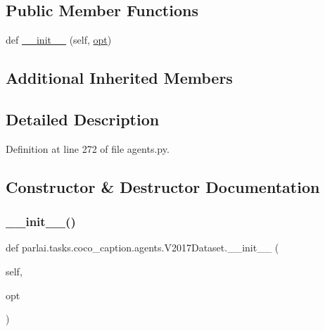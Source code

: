 \subsection*{Public Member Functions}
\begin{DoxyCompactItemize}
\item 
def \hyperlink{classparlai_1_1tasks_1_1coco__caption_1_1agents_1_1V2017Dataset_a7469de10b2d6e7c7563e3bf713cd216e}{\+\_\+\+\_\+init\+\_\+\+\_\+} (self, \hyperlink{classparlai_1_1tasks_1_1coco__caption_1_1agents_1_1DefaultDataset_adaa89b61b63ef4c1291774fda7abaf3c}{opt})
\end{DoxyCompactItemize}
\subsection*{Additional Inherited Members}


\subsection{Detailed Description}


Definition at line 272 of file agents.\+py.



\subsection{Constructor \& Destructor Documentation}
\mbox{\label{classparlai_1_1tasks_1_1coco__caption_1_1agents_1_1V2017Dataset_a7469de10b2d6e7c7563e3bf713cd216e}} 
\subsubsection{\texorpdfstring{\+\_\+\+\_\+init\+\_\+\+\_\+()}{\_\_init\_\_()}}
{\footnotesize\ttfamily def parlai.\+tasks.\+coco\+\_\+caption.\+agents.\+V2017\+Dataset.\+\_\+\+\_\+init\+\_\+\+\_\+ (\begin{DoxyParamCaption}\item[{}]{self,  }\item[{}]{opt }\end{DoxyParamCaption})}



